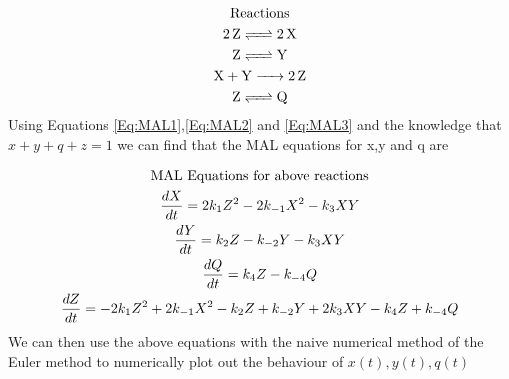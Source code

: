 \documentclass[11pt,a4paper]{CLabBookTemplate} %
\begin{document}
\begin{gather}
\label{Reactions}
\textrm{Reactions} \notag \\
\ce{2Z <=> 2X} \\
\ce{Z <=> Y} \\
\ce{X + Y -> 2Z} \\
\ce{Z <=> Q} 
\end{gather}
Using Equations \eqref{Eq:MAL1},\eqref{Eq:MAL2} and \eqref{Eq:MAL3} and the knowledge that $x + y + q + z = 1$ we can find that the MAL equations for x,y and q are

\begin{gather}
\textrm{MAL Equations for above reactions} \notag \\
\frac{dX}{dt} = 2k_{1}Z^{2} - 2k_{-1}X^{2} - k_{3}XY \\
\frac{dY}{dt} = k_{2}Z - k_{-2}Y - k_{3}XY \\
\frac{dQ}{dt} = k_{4}Z - k_{-4}Q \\
\frac{dZ}{dt} = - 2k_{1}Z^{2} + 2k_{-1}X^{2} - k_{2}Z + k_{-2}Y + 2k_{3}XY -  k_{4}Z + k_{-4}Q 
\end{gather}
We can then use the above equations with the naive numerical method of the Euler method to numerically plot out the behaviour of $x(t),y(t),q(t)$


\newpage
\end{document}
